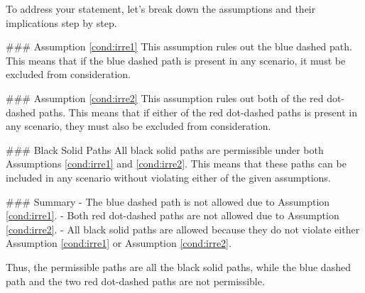 To address your statement, let's break down the assumptions and their implications step by step.

### Assumption \ref{cond:irre1}
This assumption rules out the blue dashed path. This means that if the blue dashed path is present in any scenario, it must be excluded from consideration.

### Assumption \ref{cond:irre2}
This assumption rules out both of the red dot-dashed paths. This means that if either of the red dot-dashed paths is present in any scenario, they must also be excluded from consideration.

### Black Solid Paths
All black solid paths are permissible under both Assumptions \ref{cond:irre1} and \ref{cond:irre2}. This means that these paths can be included in any scenario without violating either of the given assumptions.

### Summary
- The blue dashed path is not allowed due to Assumption \ref{cond:irre1}.
- Both red dot-dashed paths are not allowed due to Assumption \ref{cond:irre2}.
- All black solid paths are allowed because they do not violate either Assumption \ref{cond:irre1} or Assumption \ref{cond:irre2}.

Thus, the permissible paths are all the black solid paths, while the blue dashed path and the two red dot-dashed paths are not permissible.